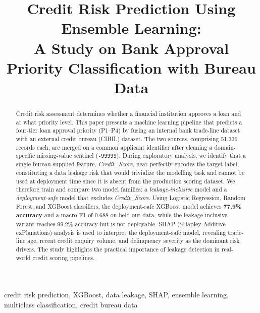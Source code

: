 \documentclass[conference]{IEEEtran}
\begin{document}
\title{Credit Risk Prediction Using Ensemble Learning: \\
A Study on Bank Approval Priority Classification with Bureau Data}

\author{
}

\maketitle

\begin{abstract}
Credit risk assessment determines whether a financial institution approves a loan and at what priority level. This paper presents a machine learning pipeline that predicts a four-tier loan approval priority (P1--P4) by fusing an internal bank trade-line dataset with an external credit bureau (CIBIL) dataset. The two sources, comprising 51{,}336 records each, are merged on a common applicant identifier after cleaning a domain-specific missing-value sentinel (\texttt{-99999}). During exploratory analysis, we identify that a single bureau-supplied feature, \textit{Credit\_Score}, near-perfectly encodes the target label, constituting a data leakage risk that would trivialize the modelling task and cannot be used at deployment time since it is absent from the production scoring dataset. We therefore train and compare two model families: a \textit{leakage-inclusive} model and a \textit{deployment-safe} model that excludes \textit{Credit\_Score}. Using Logistic Regression, Random Forest, and XGBoost classifiers, the deployment-safe XGBoost model achieves \textbf{77.9\% accuracy} and a macro-F1 of 0.688 on held-out data, while the leakage-inclusive variant reaches 99.2\% accuracy but is not deployable. SHAP (SHapley Additive exPlanations) analysis is used to interpret the deployment-safe model, revealing trade-line age, recent credit enquiry volume, and delinquency severity as the dominant risk drivers. The study highlights the practical importance of leakage detection in real-world credit scoring pipelines.
\end{abstract}

\begin{IEEEkeywords}
credit risk prediction, XGBoost, data leakage, SHAP, ensemble learning, multiclass classification, credit bureau data
\end{IEEEkeywords}
\end{document}
